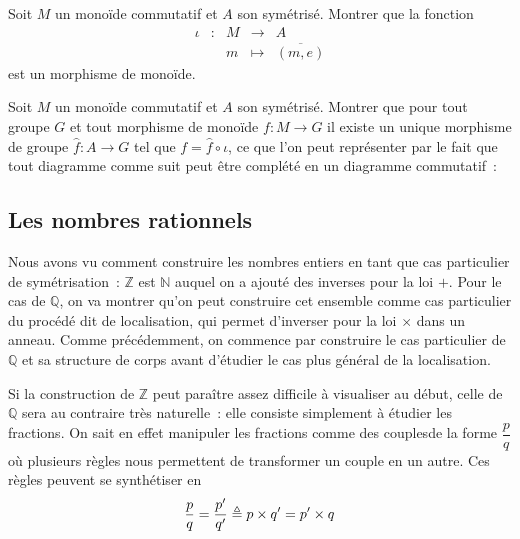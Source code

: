 \begin{exercise}
  Soit $M$ un monoïde commutatif et $A$ son symétrisé. Montrer que la fonction
  \[\begin{array}{ccccc}
  \iota & : & M & \longrightarrow & A\\
  & & m & \longmapsto & \overline{(m,e)}
  \end{array}\]
  est un morphisme de monoïde.
\end{exercise}

\begin{exercise}
  Soit $M$ un monoïde commutatif et $A$ son symétrisé. Montrer que pour tout
  groupe $G$ et tout morphisme de monoïde $f : M \to G$ il existe un unique
  morphisme de groupe $\hat f : A \to G$ tel que $f = \hat f \circ \iota$, ce
  que l'on peut représenter par le fait que tout diagramme comme suit peut être
  complété en un diagramme commutatif~:
  \begin{center}
  \end{center}
\end{exercise}

\subsection{Les nombres rationnels}

Nous avons vu comment construire les nombres entiers en tant que cas particulier
de symétrisation~: $\mathbb Z$ est $\mathbb N$ auquel on a ajouté des inverses
pour la loi $+$. Pour le cas de $\mathbb Q$, on va montrer qu'on peut construire
cet ensemble comme cas particulier du procédé dit de localisation, qui permet
d'inverser pour la loi $\times$ dans un anneau. Comme précédemment, on commence
par construire le cas particulier de $\mathbb Q$ et sa structure de corps avant
d'étudier le cas plus général de la localisation.

Si la construction de $\mathbb Z$ peut paraître assez difficile à visualiser
au début, celle de $\mathbb Q$ sera au contraire très naturelle~: elle
consiste simplement à étudier les fractions. On sait en effet manipuler les
fractions comme des \og couples\fg de la forme $\dfrac{p}{q}$ où plusieurs
règles nous permettent de transformer un couple en un autre. Ces règles peuvent
se synthétiser en
\[\frac{p}{q} = \frac{p'}{q'} \triangleq p\times q' = p' \times q\]

